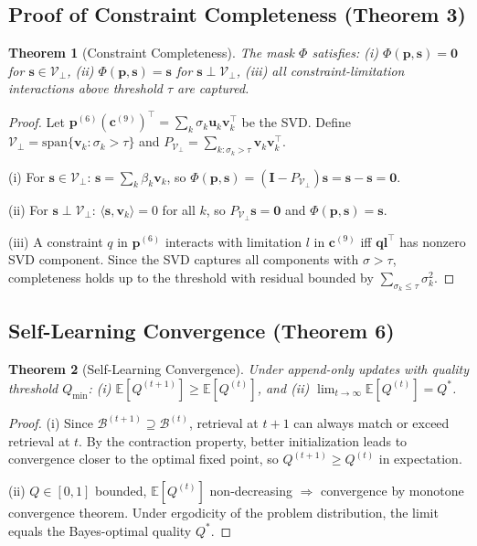 \documentclass{article}
\newtheorem{theorem}{Theorem}
\newcommand{\E}{\mathbb{E}}
\newcommand{\cV}{\mathcal{V}}
\newcommand{\cB}{\mathcal{B}}
\newcommand{\bc}{\mathbf{c}}
\newcommand{\bp}{\mathbf{p}}
\newcommand{\bs}{\mathbf{s}}
\newcommand{\bI}{\mathbf{I}}
\begin{document}
\subsection{Proof of Constraint Completeness (Theorem 3)}

\begin{theorem}[Constraint Completeness]
The mask $\Phi$ satisfies: (i) $\Phi(\bp, \bs) = \mathbf{0}$ for $\bs \in \cV_\perp$, (ii) $\Phi(\bp, \bs) = \bs$ for $\bs \perp \cV_\perp$, (iii) all constraint-limitation interactions above threshold $\tau$ are captured.
\end{theorem}

\begin{proof}
Let $\bp^{(6)} (\bc^{(9)})^\top = \sum_k \sigma_k \mathbf{u}_k \mathbf{v}_k^\top$ be the SVD. Define $\cV_\perp = \text{span}\{\mathbf{v}_k : \sigma_k > \tau\}$ and $P_{\cV_\perp} = \sum_{k:\sigma_k > \tau} \mathbf{v}_k \mathbf{v}_k^\top$.

(i) For $\bs \in \cV_\perp$: $\bs = \sum_k \beta_k \mathbf{v}_k$, so $\Phi(\bp, \bs) = (\bI - P_{\cV_\perp})\bs = \bs - \bs = \mathbf{0}$.

(ii) For $\bs \perp \cV_\perp$: $\langle \bs, \mathbf{v}_k \rangle = 0$ for all $k$, so $P_{\cV_\perp}\bs = \mathbf{0}$ and $\Phi(\bp, \bs) = \bs$.

(iii) A constraint $q$ in $\bp^{(6)}$ interacts with limitation $l$ in $\bc^{(9)}$ iff $\mathbf{q}\mathbf{l}^\top$ has nonzero SVD component. Since the SVD captures all components with $\sigma > \tau$, completeness holds up to the threshold with residual bounded by $\sum_{\sigma_k \leq \tau} \sigma_k^2$.
\end{proof}

\subsection{Self-Learning Convergence (Theorem 6)}

\begin{theorem}[Self-Learning Convergence]\label{thm:selflearn}
Under append-only updates with quality threshold $Q_{\min}$: (i) $\E[Q^{(t+1)}] \geq \E[Q^{(t)}]$, and (ii) $\lim_{t \to \infty} \E[Q^{(t)}] = Q^*$.
\end{theorem}

\begin{proof}
(i) Since $\cB^{(t+1)} \supseteq \cB^{(t)}$, retrieval at $t+1$ can always match or exceed retrieval at $t$. By the contraction property, better initialization leads to convergence closer to the optimal fixed point, so $Q^{(t+1)} \geq Q^{(t)}$ in expectation.

(ii) $Q \in [0,1]$ bounded, $\E[Q^{(t)}]$ non-decreasing $\Rightarrow$ convergence by monotone convergence theorem. Under ergodicity of the problem distribution, the limit equals the Bayes-optimal quality $Q^*$.
\end{proof}
\end{document}
